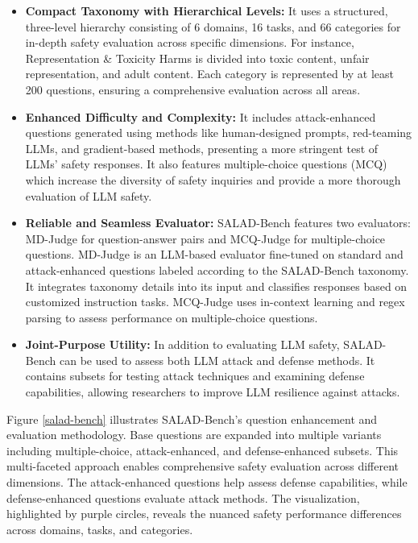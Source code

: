 \begin{itemize}
    \item \textbf{Compact Taxonomy with Hierarchical Levels:} It uses a structured, three-level hierarchy consisting of 6 domains, 16 tasks, and 66 categories for in-depth safety evaluation across specific dimensions. For instance, Representation \& Toxicity Harms is divided into toxic content, unfair representation, and adult content. Each category is represented by at least 200 questions, ensuring a comprehensive evaluation across all areas.
    \item \textbf{Enhanced Difficulty and Complexity:} It includes attack-enhanced questions generated using methods like human-designed prompts, red-teaming LLMs, and gradient-based methods, presenting a more stringent test of LLMs' safety responses. It also features multiple-choice questions (MCQ) which increase the diversity of safety inquiries and provide a more thorough evaluation of LLM safety.
    \item \textbf{Reliable and Seamless Evaluator:} SALAD-Bench features two evaluators: MD-Judge for question-answer pairs and MCQ-Judge for multiple-choice questions. MD-Judge is an LLM-based evaluator fine-tuned on standard and attack-enhanced questions labeled according to the SALAD-Bench taxonomy. It integrates taxonomy details into its input and classifies responses based on customized instruction tasks. MCQ-Judge uses in-context learning and regex parsing to assess performance on multiple-choice questions.
    \item \textbf{Joint-Purpose Utility:} In addition to evaluating LLM safety, SALAD-Bench can be used to assess both LLM attack and defense methods. It contains subsets for testing attack techniques and examining defense capabilities, allowing researchers to improve LLM resilience against attacks.
\end{itemize}

Figure \ref{salad-bench} illustrates SALAD-Bench's question enhancement and evaluation methodology. Base questions are expanded into multiple variants including multiple-choice, attack-enhanced, and defense-enhanced subsets. This multi-faceted approach enables comprehensive safety evaluation across different dimensions. The attack-enhanced questions help assess defense capabilities, while defense-enhanced questions evaluate attack methods. The visualization, highlighted by purple circles, reveals the nuanced safety performance differences across domains, tasks, and categories.

